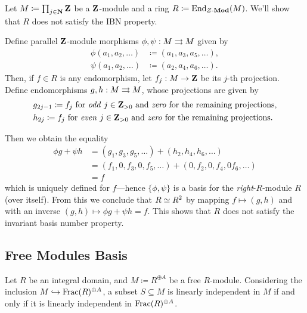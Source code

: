 \begin{example}
\label{exp:End(Zinfty)-not-IBM}
Let \(M \coloneq \prod_{j \in \mathbf{N}} \mathbf{Z}\) be a \(\mathbf{Z}\)-module and a ring
\(R \coloneq \operatorname{End}_{{Z\text{-}\textbf{Mod}}}(M)\). We'll show that \(R\) does not satisfy the IBN
property.

Define parallel \(\mathbf{Z}\)-module morphisms \(\phi, \psi: M \rightrightarrows M\) given by
\begin{align*}
  \phi(a_1, a_2, \dots) &\coloneq (a_1, a_3, a_5,\dots), \\
  \psi(a_1, a_2, \dots) &\coloneq (a_2, a_4, a_6,\dots).
\end{align*}
Then, if \(f \in R\) is any endomorphism, let \(f_j: M \to \mathbf{Z}\) be its \(j\)-th
projection. Define endomorphisms \(g, h: M \rightrightarrows M\), whose projections are
given by
\begin{align*}
&g_{2j - 1} \coloneq f_j\ \text{for \emph{odd}}\
j \in \mathbf{Z}_{> 0}\ \text{and \emph{zero} for the remaining projections,} \\
&h_{2j} \coloneq f_j\ \text{for \emph{even}}\
j \in \mathbf{Z}_{> 0}\ \text{and \emph{zero} for the remaining projections.}
\end{align*}

Then we obtain the equality
\begin{align*}
\phi g + \psi h
&= (g_1, g_3, g_5, \dots) + (h_2, h_4, h_6, \dots) \\
&= (f_1, 0, f_3, 0, f_5, \dots)
+ (0, f_2, 0, f_4, 0 f_6, \dots) \\
&= f
\end{align*}
which is uniquely defined for \(f\)---hence \(\{\phi, \psi\}\) is a basis for
the \emph{right}-\(R\)-module \(R\) (over itself). From this we conclude that
\(R \simeq R^2\) by mapping \(f \mapsto (g, h)\) and with an inverse
\((g, h) \mapsto \phi g + \psi h = f\). This shows that \(R\) does not satisfy
the invariant basis number property.
\end{example}

\subsection{Free Modules Basis}

\begin{lemma}
\label{lem:LI-in-free-iff-LI-in-free-over-field-of-fractions}
Let \(R\) be an integral domain, and \(M \coloneq R^{\oplus A}\) be a free
\(R\)-module. Considering the inclusion \(M \hookrightarrow \operatorname{Frac}(R)^{\oplus A}\), a subset
\(S \subseteq M\) is linearly independent in \(M\) if and only if it is linearly
independent in \(\operatorname{Frac}(R)^{\oplus A}\).
\end{lemma}

